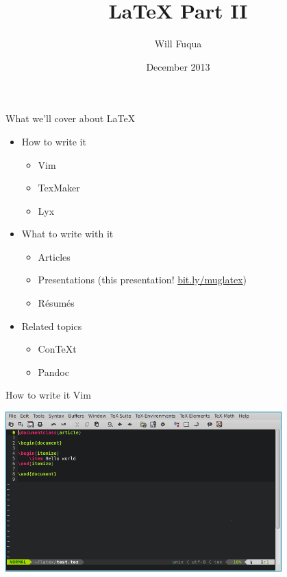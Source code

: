 \documentclass{beamer}
\author{Will Fuqua}
\title{\LaTeX{} Part II}
\institute{Michigan!/usr/group}
\date{December 2013}
\begin{document}
\begin{frame}[t,plain]
    \titlepage
\end{frame}

\begin{frame}[t]{What we'll cover about \LaTeX}
    \begin{itemize}
        \item How to write it
            \begin{itemize}
                \item Vim
                \item TexMaker
                \item Lyx
            \end{itemize}
            \pause
        \item What to write with it
            \begin{itemize}
                \item Articles
                \item Presentations 
                    (this presentation! \href{http://bit.ly/muglatex}{bit.ly/muglatex})
                \item R\'{e}sum\'{e}s
            \end{itemize}
            \pause
        \item Related topics
            \begin{itemize}
                \item ConTeXt
                \item Pandoc
            \end{itemize}
    \end{itemize}
\end{frame}

\begin{frame}{How to write it \textendash{} Vim}
    \begin{center}
        \includegraphics[width=0.8\textwidth]{img/vim}
    \end{center}
\end{frame}
\end{document}
